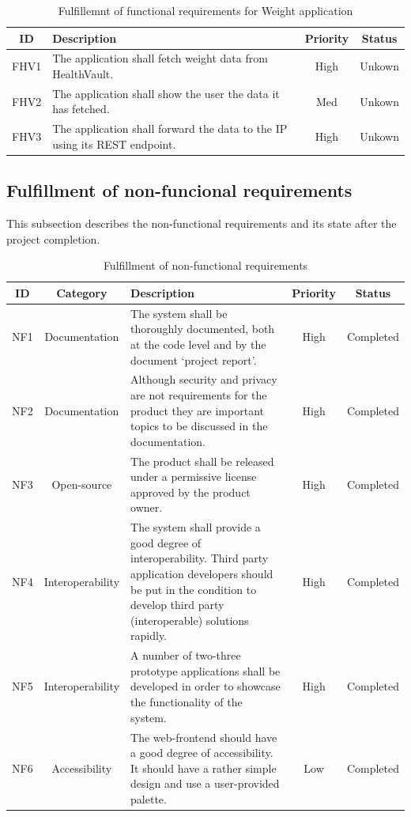 \begin{table}[H]
\begin{center}
\begin{tabular}{ | c | p{9cm} | c | c |}
  \hline
  ID & Description & Priority & Status\\
  \hline\noalign{\smallskip}\noalign{\smallskip}\hline
  FHV1	& The application shall fetch weight data from HealthVault.						      & High & Unkown \\
  FHV2	& The application shall show the user the data it has fetched.              & Med & Unkown \\
  FHV3	& The application shall forward the data to the IP using its REST endpoint. & High & Unkown \\
  \hline
\end{tabular}
\end{center}
\caption{Fulfillemnt of functional requirements for Weight application}
\label{table:fulfillemntweightapp}
\end{table}

\subsection{Fulfillment of non-funcional requirements}
This subsection describes the non-functional requirements and its state after the project completion. 

\begin{table}[H]
\begin{center}
\begin{tabular}{ | c | c |p{6.5cm} | c | c |}
  \hline
  ID & Category & Description & Priority & Status\\
  \hline\noalign{\smallskip}\noalign{\smallskip}\hline
  NF1 & Documentation & The system shall be thoroughly documented, both at the code level and by the document ‘project report’.
  & High & Completed \\
  NF2 & Documentation & Although security and privacy are not requirements for the product they are important topics to be discussed in the documentation.
  & High & Completed \\
  NF3 & Open-source	& The product shall be released under a permissive license approved by the product owner.
  & High & Completed \\
  NF4 & Interoperability & The system shall provide a good degree of interoperability. Third party application developers should be put in the condition to develop third party (interoperable) solutions rapidly.
  & High & Completed \\
  NF5 & Interoperability & A number of two-three prototype applications shall be developed in order to showcase the functionality of the system.
  & High & Completed \\
  NF6 & Accessibility & The web-frontend should have a good degree of accessibility. It should have a rather simple design and use a user-provided palette.
  & Low & Completed \\
  \hline
\end{tabular}
\end{center}
\caption{Fulfillment of non-functional requirements}
\label{table:fullfilmentnonfunctionalreq}
\end{table} 

